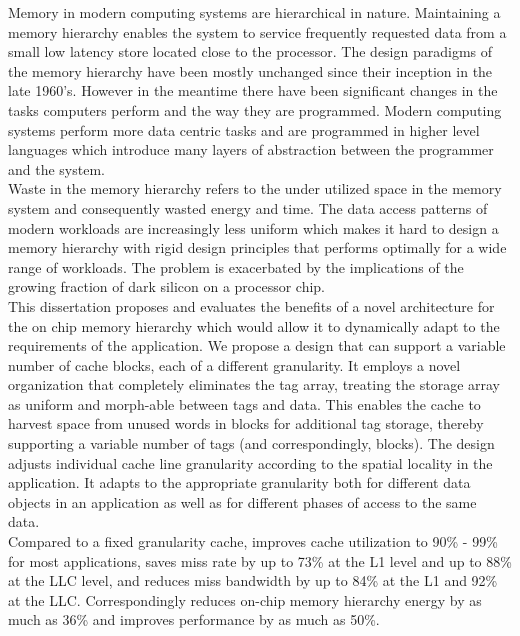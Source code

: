 
%
%


Memory in modern computing systems are hierarchical in
nature. Maintaining a memory hierarchy enables the system to service
frequently requested data from a small low latency store located close
to the processor. The design paradigms of the memory hierarchy have
been mostly unchanged since their inception in the late
1960's. However in the meantime there have been significant changes in
the tasks computers perform and the way they are programmed. Modern
computing systems perform more data centric tasks and are programmed
in higher level languages which introduce many layers of abstraction
between the programmer and the system. \\ 

Waste in the memory hierarchy refers to the under utilized space in
the memory system and consequently wasted energy and time. The data
access patterns of modern workloads are increasingly less uniform
which makes it hard to design a memory hierarchy with rigid design
principles that performs optimally for a wide range of workloads.  The
problem is exacerbated by the implications of the growing fraction of
dark silicon on a processor chip. \\

This dissertation proposes and evaluates the benefits of a novel
architecture for the on chip memory hierarchy which would allow it to
dynamically adapt to the requirements of the application. We propose a
design that can support a variable number of cache blocks, each of a
different granularity. It employs a novel organization that completely
eliminates the tag array, treating the storage array as uniform and
morph-able between tags and data.  This enables the cache to harvest
space from unused words in blocks for additional tag storage, thereby
supporting a variable number of tags (and correspondingly, blocks).
The design adjusts individual cache line granularity according to
the spatial locality in the application.  It adapts to the appropriate
granularity both for different data objects in an application as well
as for different phases of access to the same data. \\

Compared to a fixed granularity cache, improves cache utilization to
90\% - 99\% for most applications, saves miss rate by up to 73\% at
the L1 level and up to 88\% at the LLC level, and reduces miss
bandwidth by up to 84\% at the L1 and 92\% at the LLC. Correspondingly
reduces on-chip memory hierarchy energy by as much as 36\% and
improves performance by as much as 50\%.
